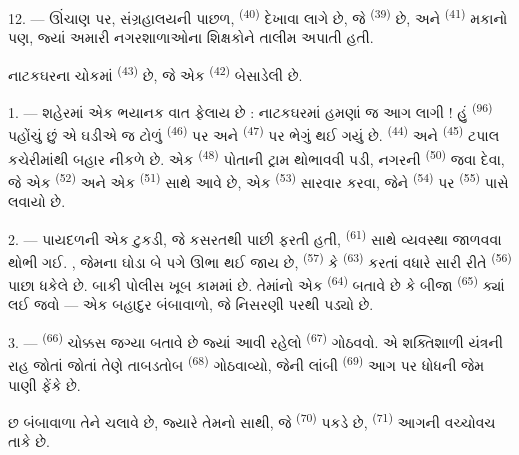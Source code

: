 12. --- ઊંચાણ પર, સંગ્રહાલયની પાછળ, 
\textsuperscript{(40)} દેખાવા લાગે છે, જે 
\textsuperscript{(39)} છે, અને 
\textsuperscript{(41)} મકાનો પણ, જ્યાં અમારી નગરશાળાઓના શિક્ષકોને
તાલીમ અપાતી હતી.

નાટકઘરના ચોકમાં  \textsuperscript{(43)} છે, જે એક
 \textsuperscript{(42)} બેસાડેલી છે.

\VUsaut{5.0mm}
\VUsaut{3.0mm}

\VUsaut{3.4mm}

1. --- શહેરમાં એક ભયાનક વાત ફેલાય છે : નાટકઘરમાં હમણાં જ આગ લાગી ! હું
 \textsuperscript{(96)} પહોંચું છું એ ઘડીએ જ ટોળું
 \textsuperscript{(46)} પર અને 
\textsuperscript{(47)} પર ભેગું થઈ ગયું છે.  \textsuperscript{(44)} અને 
\textsuperscript{(45)} ટપાલ કચેરીમાંથી બહાર નીકળે છે. એક
 \textsuperscript{(48)} પોતાની ટ્રામ થોભાવવી પડી,
નગરની  \textsuperscript{(50)} જવા દેવા, જે એક
 \textsuperscript{(52)} અને એક 
\textsuperscript{(51)} સાથે આવે છે, એક 
\textsuperscript{(53)} સારવાર કરવા, જેને 
\textsuperscript{(54)} પર  \textsuperscript{(55)}
પાસે લવાયો છે.

2. --- પાયદળની એક ટુકડી, જે કસરતથી પાછી ફરતી હતી,  \textsuperscript{(61)} સાથે વ્યવસ્થા જાળવવા થોભી ગઈ.
, જેમના ઘોડા બે પગે ઊભા થઈ જાય છે,
 \textsuperscript{(57)} કે 
\textsuperscript{(63)} કરતાં વધારે સારી રીતે 
\textsuperscript{(56)} પાછા ધકેલે છે. બાકી પોલીસ ખૂબ કામમાં છે.
તેમાંનો એક  \textsuperscript{(64)} બતાવે છે કે બીજા
 \textsuperscript{(65)} ક્યાં લઈ જવો —
એક બહાદુર બંબાવાળો, જે નિસરણી પરથી પડ્યો છે.

3. ---  \textsuperscript{(66)} ચોક્કસ જગ્યા બતાવે છે
જ્યાં આવી રહેલો  \textsuperscript{(67)} ગોઠવવો.
એ શક્તિશાળી યંત્રની રાહ જોતાં જોતાં તેણે તાબડતોબ 
\textsuperscript{(68)} ગોઠવાવ્યો, જેની લાંબી 
\textsuperscript{(69)} આગ પર ધોધની જેમ પાણી ફેંકે છે.

છ બંબાવાળા તેને ચલાવે છે, જ્યારે તેમનો સાથી, જે 
\textsuperscript{(70)} પકડે છે,  \textsuperscript{(71)}
આગની વચ્ચોવચ તાકે છે.

